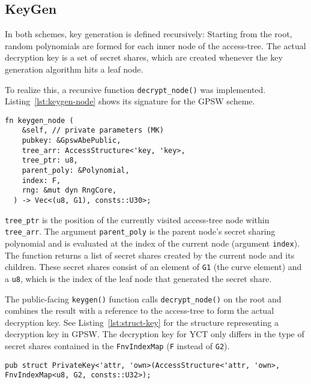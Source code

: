 \subsection{KeyGen}
In both schemes, key generation is defined recursively:
Starting from the root, random polynomials are formed for each inner node of the \gls{access-tree}.
The actual decryption key is a set of secret shares, which are created whenever the key generation algorithm hits a leaf node.

To realize this, a recursive function \verb+decrypt_node()+ was implemented.
Listing~\ref{lst:keygen-node} shows its signature for the GPSW scheme. 

\begin{lstlisting}[float=h,caption={Function signature of recursive key generation},label={lst:keygen-node}]
fn keygen_node (
    &self, // private parameters (MK)
    pubkey: &GpswAbePublic,
    tree_arr: AccessStructure<'key, 'key>,
    tree_ptr: u8,
    parent_poly: &Polynomial,
    index: F,
    rng: &mut dyn RngCore,
  ) -> Vec<(u8, G1), consts::U30>;
\end{lstlisting}

\verb+tree_ptr+ is the position of the currently visited \gls{access-tree} node within \verb+tree_arr+.
The argument \verb+parent_poly+ is the parent node's secret sharing polynomial and is evaluated at the index of the current node (argument \texttt{index}).
The function returns a list of secret shares created by the current node and its children. 
These secret shares consist of an element of \texttt{G1} (the curve element) and a \texttt{u8}, which is the index of the leaf node that generated the secret share.

The public-facing \verb+keygen()+ function calls \verb+decrypt_node()+ on the root and combines the result with a reference to the \gls{access-tree} to form the actual decryption key.
See Listing~\ref{lst:struct-key} for the structure representing a decryption key in GPSW.
The decryption key for YCT only differs in the type of secret shares contained in the \texttt{FnvIndexMap} (\texttt{F} instead of \texttt{G2}).

\begin{lstlisting}[float=h,caption={Decryption key struct},label={lst:struct-key}, breaklines=true]
pub struct PrivateKey<'attr, 'own>(AccessStructure<'attr, 'own>, FnvIndexMap<u8, G2, consts::U32>);
\end{lstlisting}

